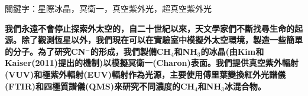 \begin{abstractcn}

關鍵字：星際冰晶，冥衛一，真空紫外光，超真空紫外光
\vspace{2em}

\textbf{我們永遠不會停止探索外太空的，自二十世紀以來，天文學家們不斷找尋生命的起源。除了觀測恆星以外，我們現在可以在實驗室中模擬外太空環境，製造一些簡單的分子。為了研究CN$^−$的形成，我們製備CH$_4$和NH$_3$的冰晶(由Kim和Kaiser(2011)\cite{kim}提出的機制)以模擬冥衛一(Charon)表面。我們提供真空紫外輻射(VUV)和極紫外輻射(EUV)輻射作為光源，主要使用傅里葉變換紅外光譜儀(FTIR)和四極質譜儀(QMS)來研究不同濃度的CH$_4$和NH$_3$冰混合物。}


\end{abstractcn} 
